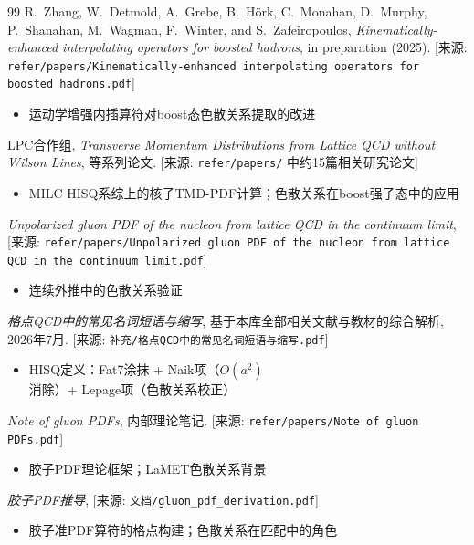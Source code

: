 \documentclass[12pt,a4paper]{ctexart}
\theoremstyle{definition}
\begin{document}
\begin{thebibliography}{99}
R.~Zhang, W.~Detmold, A.~Grebe, B.~H\"ork, C.~Monahan, D.~Murphy, P.~Shanahan, M.~Wagman, F.~Winter, and S.~Zafeiropoulos,
\textit{Kinematically-enhanced interpolating operators for boosted hadrons},
in preparation (2025).
[来源: \texttt{refer/papers/Kinematically-enhanced interpolating operators for boosted hadrons.pdf}]
\begin{itemize}
    \item 运动学增强内插算符对boost态色散关系提取的改进
\end{itemize}

LPC合作组,
\textit{Transverse Momentum Distributions from Lattice QCD without Wilson Lines},
等系列论文.
[来源: \texttt{refer/papers/} 中约15篇相关研究论文]
\begin{itemize}
    \item MILC HISQ系综上的核子TMD-PDF计算；色散关系在boost强子态中的应用
\end{itemize}

\textit{Unpolarized gluon PDF of the nucleon from lattice QCD in the continuum limit},
[来源: \texttt{refer/papers/Unpolarized gluon PDF of the nucleon from lattice QCD in the continuum limit.pdf}]
\begin{itemize}
    \item 连续外推中的色散关系验证
\end{itemize}

\textit{格点QCD中的常见名词短语与缩写},
基于本库全部相关文献与教材的综合解析, 2026年7月.
[来源: \texttt{补充/格点QCD中的常见名词短语与缩写.pdf}]
\begin{itemize}
    \item HISQ定义：Fat7涂抹 + Naik项（$O(a^2)$消除）+ Lepage项（色散关系校正）
\end{itemize}

\textit{Note of gluon PDFs},
内部理论笔记.
[来源: \texttt{refer/papers/Note of gluon PDFs.pdf}]
\begin{itemize}
    \item 胶子PDF理论框架；LaMET色散关系背景
\end{itemize}

\textit{胶子PDF推导},
[来源: \texttt{文档/gluon\_pdf\_derivation.pdf}]
\begin{itemize}
    \item 胶子准PDF算符的格点构建；色散关系在匹配中的角色
\end{itemize}

\end{thebibliography}
\end{document}
